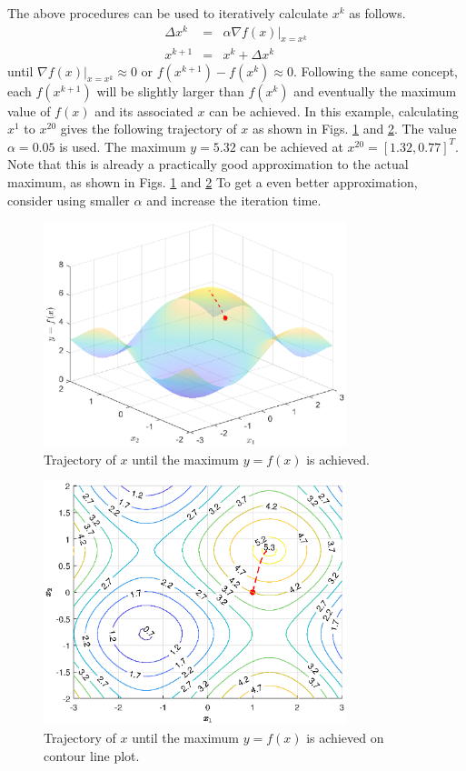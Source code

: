 The above procedures can be used to iteratively calculate $x^k$ as follows.
\begin{eqnarray}
  \Delta x^k &=& \alpha \left.\nabla f(x)\right|_{x=x^k} \nonumber \\
  x^{k+1} &=& x^k + \Delta x^k \nonumber
\end{eqnarray}
until $\left.\nabla f(x)\right|_{x=x^k} \approx 0$ or $f(x^{k+1})-f(x^k) \approx 0$. Following the same concept, each $f(x^{k+1})$ will be slightly larger than $f(x^k)$ and eventually the maximum value of $f(x)$ and its associated $x$ can be achieved. In this example, calculating $x^1$ to $x^{20}$ gives the following trajectory of $x$ as shown in Figs. \ref{ch6fig:gradientexp_3d4} and \ref{ch6fig:gradientexp_3d5}. The value $\alpha = 0.05$ is used. The maximum $y=5.32$ can be achieved at $x^{20} = [1.32, 0.77]^T$. Note that this is already a practically good approximation to the actual maximum, as shown in Figs. \ref{ch6fig:gradientexp_3d4} and \ref{ch6fig:gradientexp_3d5} To get a even better approximation, consider using smaller $\alpha$ and increase the iteration time.

\begin{figure}
	\centering
	\includegraphics[width=250pt]{chapters/part-2/figures/gradientexp_3d_trajectory.eps}
	\caption{Trajectory of $x$ until the maximum $y=f(x)$ is achieved.} \label{ch6fig:gradientexp_3d4}
\end{figure}

\begin{figure}
	\centering
	\includegraphics[width=250pt]{chapters/part-2/figures/gradientexp_contour_trajectory.eps}
	\caption{Trajectory of $x$ until the maximum $y=f(x)$ is achieved on contour line plot.} \label{ch6fig:gradientexp_3d5}
\end{figure}

